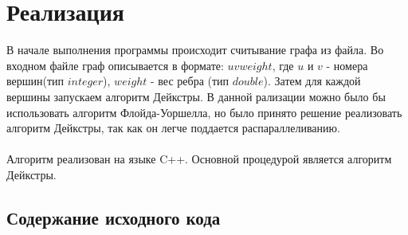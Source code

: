 \documentclass[12pt]{article}
\begin{document}
\section{Реализация} 
В начале выполнения программы происходит считывание графа из файла. 
Во входном файле граф описывается в формате: $u v weight$, где $u$ и $v$ - номера вершин(тип $integer$), 
$weight$ - вес ребра (тип $double$).
Затем для каждой вершины запускаем алгоритм Дейкстры. В данной рализации можно было бы использовать 
алгоритм Флойда-Уоршелла, но было принято решение реализовать алгоритм Дейкстры, так как он легче поддается распараллеливанию.

\paragraph{}
Алгоритм реализован на языке C++. Основной процедурой является
алгоритм Дейкстры\cite{dijkstra}.

\subsection{Содержание исходного кода}
\end{document}
